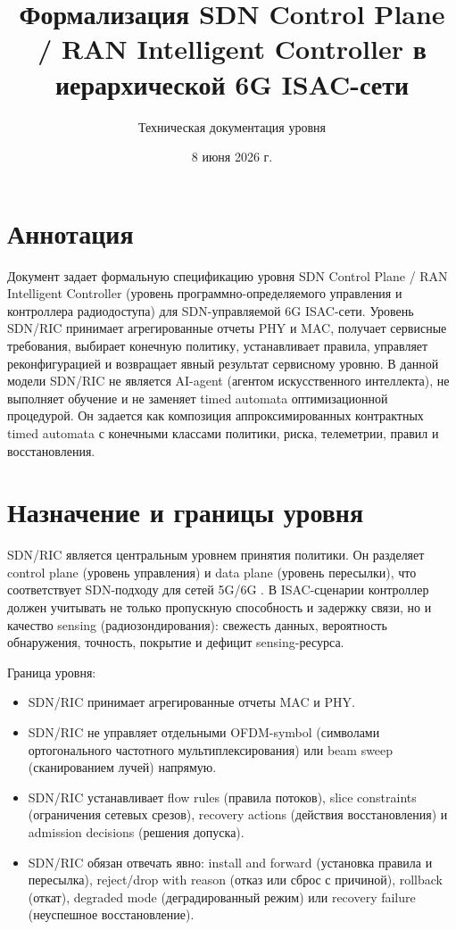 \documentclass[10pt,a4paper]{article}
\title{Формализация SDN Control Plane / RAN Intelligent Controller в иерархической 6G ISAC-сети}
\author{Техническая документация уровня}
\date{8 июня 2026 г.}
\begin{document}
\maketitle

\section*{Аннотация}

Документ задает формальную спецификацию уровня SDN Control Plane / RAN Intelligent Controller (уровень программно-определяемого управления и контроллера радиодоступа) для SDN-управляемой 6G ISAC-сети. Уровень SDN/RIC принимает агрегированные отчеты PHY и MAC, получает сервисные требования, выбирает конечную политику, устанавливает правила, управляет реконфигурацией и возвращает явный результат сервисному уровню. В данной модели SDN/RIC не является AI-agent (агентом искусственного интеллекта), не выполняет обучение и не заменяет timed automata оптимизационной процедурой. Он задается как композиция аппроксимированных контрактных timed automata с конечными классами политики, риска, телеметрии, правил и восстановления.

\section{Назначение и границы уровня}

SDN/RIC является центральным уровнем принятия политики. Он разделяет control plane (уровень управления) и data plane (уровень пересылки), что соответствует SDN-подходу для сетей 5G/6G \cite{mosudi_sdn,zolanvari_sdn}. В ISAC-сценарии контроллер должен учитывать не только пропускную способность и задержку связи, но и качество sensing (радиозондирования): свежесть данных, вероятность обнаружения, точность, покрытие и дефицит sensing-ресурса.

Граница уровня:
\begin{itemize}
  \item SDN/RIC принимает агрегированные отчеты MAC и PHY.
  \item SDN/RIC не управляет отдельными OFDM-symbol (символами ортогонального частотного мультиплексирования) или beam sweep (сканированием лучей) напрямую.
  \item SDN/RIC устанавливает flow rules (правила потоков), slice constraints (ограничения сетевых срезов), recovery actions (действия восстановления) и admission decisions (решения допуска).
  \item SDN/RIC обязан отвечать явно: install and forward (установка правила и пересылка), reject/drop with reason (отказ или сброс с причиной), rollback (откат), degraded mode (деградированный режим) или recovery failure (неуспешное восстановление).
\end{itemize}
\end{document}
